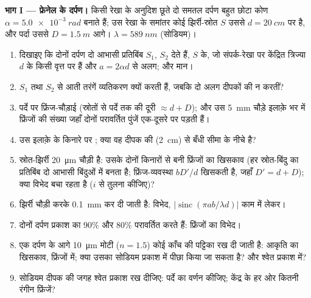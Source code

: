 \begin{problem}
\label{pb:b2:two-wave-interference:1}

\medskip
\noindent\textbf{भाग I --- फ्रेनेल के दर्पण।}
किसी रेखा के अनुदिश छूते दो समतल दर्पण बहुत छोटा कोण $\alpha =
\qty{5.0e-3}{rad}$ बनाते हैं; उस रेखा के समांतर कोई झिर्री-स्रोत $S$ उससे $d =
\qty{20}{cm}$ पर है, और पर्दा उससे $D = \qty{1.5}{m}$ आगे। $\lambda =
\qty{589}{nm}$ (सोडियम)।
\begin{enumerate}
  \item दिखाइए कि दोनों दर्पण दो आभासी प्रतिबिंब $S_1$, $S_2$ देते हैं,
        $S$ के, जो संपर्क-रेखा पर केंद्रित त्रिज्या $d$ के किसी वृत्त पर हैं
        और $a = 2\alpha d$ से अलग; और मान।
  \item $S_1$ तथा $S_2$ से आती तरंगें व्यतिकरण क्यों करती हैं, जबकि
        दो अलग दीपकों की न करतीं?
  \item पर्दे पर फ्रिंज-चौड़ाई (स्रोतों से पर्दे तक की दूरी
        $\approx d + D$); और उस \qty{5}{mm} चौड़े इलाक़े भर में फ्रिंजों की संख्या
        जहाँ दोनों परावर्तित पुंजें एक-दूसरे पर पड़ती हैं।
  \item उस इलाक़े के किनारे पर ; क्या वह दीपक की
         (\qty{2}{cm}) से बँधी सीमा के नीचे है?
  \item स्रोत-झिर्री \qty{20}{\micro m} चौड़ी है: उसके दोनों किनारों से बनी
        फ्रिंजों का खिसकाव (हर स्रोत-बिंदु का प्रतिबिंब दो
        आभासी बिंदुओं में बनता है; फ्रिंज-व्यवस्था $bD'/d$ खिसकती है, जहाँ $D' =
        d + D$); क्या विभेद बचा रहता है ($i$ से तुलना कीजिए)?
  \item झिर्री चौड़ी करके \qty{0.1}{mm} कर दी जाती है: विभेद,
        $|\operatorname{sinc}(\pi ab/\lambda d)|$ काम में लेकर।
  \item दोनों दर्पण प्रकाश का $90\%$ और $80\%$ परावर्तित करते हैं: फ्रिंजों
        का विभेद।
  \item एक दर्पण के आगे \qty{10}{\micro m} मोटी ($n = 1.5$) कोई काँच की पट्टिका
        रख दी जाती है: आकृति का खिसकाव, फ्रिंजों में; क्या उसका
        सोडियम प्रकाश में पीछा किया जा सकता है? और श्वेत प्रकाश में?
  \item सोडियम दीपक की जगह श्वेत प्रकाश रख दीजिए: पर्दे का वर्णन कीजिए;
        केंद्र के हर ओर कितनी रंगीन फ्रिंजें?
\end{enumerate}


\end{problem}
